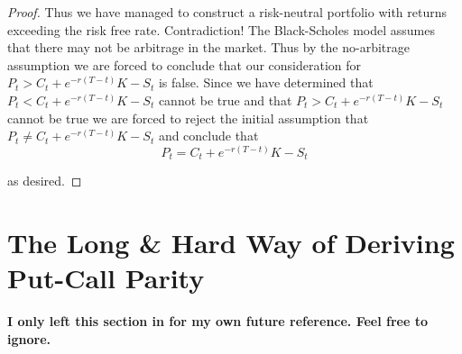 \documentclass[12pt]{article}
\makeatletter
\newlength\tindent
\renewcommand{\indent}{\hspace*{\tindent}}
\let\oldappendix\appendix %
\renewcommand\appendix{%
    \oldappendix
    \newcommand{\section@cntformat}{\appendixname~\thesection\quad}
}
\makeatother
\begin{document}
\begin{proof}
\indent Thus we have managed to construct a risk-neutral portfolio with returns exceeding the risk free rate. Contradiction! The Black-Scholes model assumes that there may not be arbitrage in the market. Thus by the no-arbitrage assumption we are forced to conclude that our consideration for $P_t > C_t + e^{-r(T - t)}K - S_t$ is false. Since we have determined that $P_t < C_t + e^{-r(T - t)}K - S_t$ cannot be true and that $P_t > C_t + e^{-r(T - t)}K - S_t$ cannot be true we are forced to reject the initial assumption that $P_t \neq C_t + e^{-r(T - t)}K - S_t$ and conclude that
\begin{equation*}
	P_t = C_t + e^{-r(T - t)}K - S_t
\end{equation*}

as desired.
\end{proof}


\newpage
\appendix
\section{The Long \& Hard Way of Deriving Put-Call Parity}
\begin{center}
{\bf I only left this section in for my own future reference. Feel free to ignore.}
\end{center}
\end{document}
